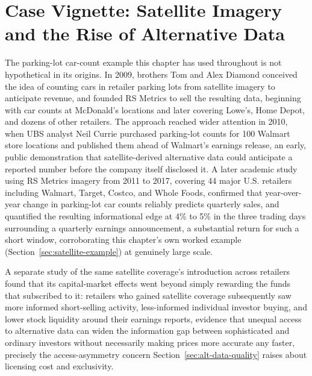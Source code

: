 \documentclass[../ai_in_finance]{subfiles}
\begin{document}
\section{Case Vignette: Satellite Imagery and the Rise of Alternative Data}
\label{sec:case-vignette-satellite}

The parking-lot car-count example this chapter has used throughout is not hypothetical in its origins. In 2009, brothers Tom and Alex Diamond conceived the idea of counting cars in retailer parking lots from satellite imagery to anticipate revenue, and founded RS Metrics to sell the resulting data, beginning with car counts at McDonald's locations and later covering Lowe's, Home Depot, and dozens of other retailers. The approach reached wider attention in 2010, when UBS analyst Neil Currie purchased parking-lot counts for 100 Walmart store locations and published them ahead of Walmart's earnings release, an early, public demonstration that satellite-derived alternative data could anticipate a reported number before the company itself disclosed it. A later academic study using RS Metrics imagery from 2011 to 2017, covering 44 major U.S. retailers including Walmart, Target, Costco, and Whole Foods, confirmed that year-over-year change in parking-lot car counts reliably predicts quarterly sales, and quantified the resulting informational edge at 4\% to 5\% in the three trading days surrounding a quarterly earnings announcement, a substantial return for such a short window, corroborating this chapter's own worked example (Section~\ref{sec:satellite-example}) at genuinely large scale.

A separate study of the same satellite coverage's introduction across retailers found that its capital-market effects went beyond simply rewarding the funds that subscribed to it: retailers who gained satellite coverage subsequently saw more informed short-selling activity, less-informed individual investor buying, and lower stock liquidity around their earnings reports, evidence that unequal access to alternative data can widen the information gap between sophisticated and ordinary investors without necessarily making prices more accurate any faster, precisely the access-asymmetry concern Section~\ref{sec:alt-data-quality} raises about licensing cost and exclusivity.
\end{document}
